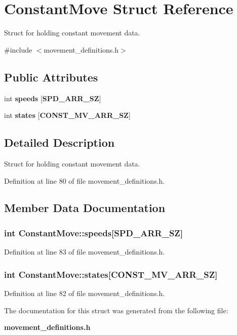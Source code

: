 \section{\-Constant\-Move \-Struct \-Reference}
\label{structConstantMove}


\-Struct for holding constant movement data.  




{\ttfamily \#include $<$movement\-\_\-definitions.\-h$>$}

\subsection*{\-Public \-Attributes}
\begin{DoxyCompactItemize}
\item 
int {\bf speeds} [{\bf \-S\-P\-D\-\_\-\-A\-R\-R\-\_\-\-S\-Z}]
\item 
int {\bf states} [{\bf \-C\-O\-N\-S\-T\-\_\-\-M\-V\-\_\-\-A\-R\-R\-\_\-\-S\-Z}]
\end{DoxyCompactItemize}


\subsection{\-Detailed \-Description}
\-Struct for holding constant movement data. 

\-Definition at line 80 of file movement\-\_\-definitions.\-h.



\subsection{\-Member \-Data \-Documentation}
\subsubsection[{speeds}]{\setlength{\rightskip}{0pt plus 5cm}int {\bf \-Constant\-Move\-::speeds}[{\bf \-S\-P\-D\-\_\-\-A\-R\-R\-\_\-\-S\-Z}]}\label{structConstantMove_a5c8f7515c66ed62480950f5937037f09}


\-Definition at line 83 of file movement\-\_\-definitions.\-h.

\subsubsection[{states}]{\setlength{\rightskip}{0pt plus 5cm}int {\bf \-Constant\-Move\-::states}[{\bf \-C\-O\-N\-S\-T\-\_\-\-M\-V\-\_\-\-A\-R\-R\-\_\-\-S\-Z}]}\label{structConstantMove_a4e63d2d1fa0a42d2a462cd9ad3a7b9f2}


\-Definition at line 82 of file movement\-\_\-definitions.\-h.



\-The documentation for this struct was generated from the following file\-:\begin{DoxyCompactItemize}
\item 
{\bf movement\-\_\-definitions.\-h}\end{DoxyCompactItemize}
